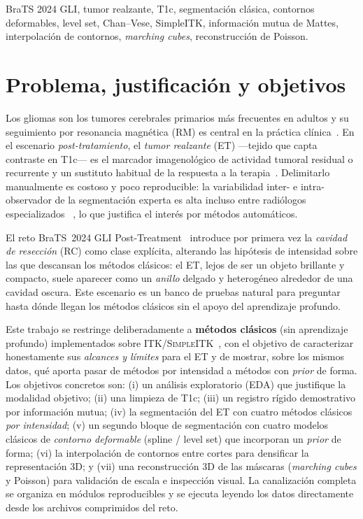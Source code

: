 \documentclass[conference]{IEEEtran}
\begin{document}
\begin{IEEEkeywords}
BraTS 2024 GLI, tumor realzante, T1c, segmentación clásica, contornos
deformables, level set, Chan--Vese, SimpleITK, información mutua de Mattes,
interpolación de contornos, \textit{marching cubes}, reconstrucción de Poisson.
\end{IEEEkeywords}

\section{Problema, justificación y objetivos}
\label{sec:intro}
Los gliomas son los tumores cerebrales primarios más frecuentes en
adultos y su seguimiento por resonancia magnética (RM) es central
en la práctica clínica~\cite{louis2021who,mesfin2024gliomas}. En el
escenario \emph{post-tratamiento}, el \emph{tumor realzante} (ET)
---tejido que capta contraste en T1c--- es el marcador imagenológico
de actividad tumoral residual o recurrente y un sustituto habitual
de la respuesta a la terapia~\cite{bhattacharya2024posttreatment}.
Delimitarlo manualmente es costoso y poco reproducible: la
variabilidad inter- e intra-observador de la segmentación experta
es alta incluso entre radiólogos especializados
~\cite{visser2019interobserver}, lo que justifica el interés por
métodos automáticos.

El reto BraTS~2024 GLI Post-Treatment~\cite{deverdier2024brats,baid2021brats}
introduce por primera vez la \emph{cavidad de resección} (RC) como
clase explícita, alterando las hipótesis de intensidad sobre las que
descansan los métodos clásicos: el ET, lejos de ser un objeto
brillante y compacto, suele aparecer como un \emph{anillo} delgado
y heterogéneo alrededor de una cavidad oscura. Este escenario es
un banco de pruebas natural para preguntar hasta dónde llegan los
métodos clásicos sin el apoyo del aprendizaje profundo.

Este trabajo se restringe deliberadamente a \textbf{métodos
clásicos} (sin aprendizaje profundo) implementados sobre
\textsc{ITK/SimpleITK}~\cite{lloyd2010itk}, con el objetivo de
caracterizar honestamente sus \emph{alcances y límites} para el ET y de
mostrar, sobre los mismos datos, qué aporta pasar de métodos por
intensidad a métodos con \emph{prior} de forma. Los objetivos concretos
son: (i) un análisis exploratorio (EDA) que justifique la modalidad
objetivo; (ii) una limpieza de T1c; (iii) un registro rígido demostrativo
por información mutua; (iv) la segmentación del ET con cuatro métodos
clásicos \emph{por intensidad}; (v) un segundo bloque de segmentación con
cuatro modelos clásicos de \emph{contorno deformable} (spline / level set)
que incorporan un \emph{prior} de forma; (vi) la interpolación de
contornos entre cortes para densificar la representación 3D; y (vii) una
reconstrucción 3D de las máscaras (\textit{marching cubes} y Poisson) para
validación de escala e inspección visual. La canalización completa se
organiza en módulos reproducibles y se ejecuta leyendo los datos
directamente desde los archivos comprimidos del reto.
\end{document}
